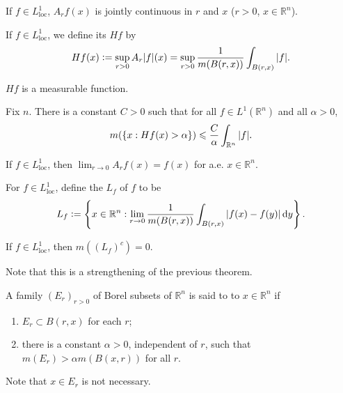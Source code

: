 \documentclass[12pt]{article}	%
\newcommand{\loc}{L^{1}_{\operatorname{loc}}}
\begin{document}
\begin{prop}
	If $f \in \loc$, $A_{r}f(x)$ is jointly continuous in $r$ and $x$ ($r > 0$, $x \in \mathbb{R}^{n}$).
\end{prop}

\begin{defn}
	If $f \in \loc$, we define its  $Hf$ by
	\begin{equation*} 
		Hf(x) \vcentcolon= \sup_{r > 0} A_{r}{\left\lvert f \right\lvert}(x) = \sup_{r > 0} \frac{1}{m(B(r, x))} \int_{B(r, x)} {\left\lvert f \right\lvert}.
	\end{equation*}
\end{defn}
$Hf$ is a measurable function.

\begin{thm}
	Fix $n$. There is a constant $C > 0$ such that for all $f \in L^{1}(\mathbb{R}^{n})$ and all $\alpha > 0$,
	\begin{equation*} 
		m(\{x : Hf(x) > \alpha\}) \leqslant \frac{C}{\alpha} \int_{\mathbb{R}^{n}} {\left\lvert f \right\lvert}.
	\end{equation*}
\end{thm}

\begin{thm}
	If $f \in \loc$, then $\lim_{r \to 0} A_{r}f(x) = f(x)$ for a.e. $x \in \mathbb{R}^{n}$.
\end{thm}

\begin{defn}
	For $f \in \loc$, define the  $L_{f}$ of $f$ to be 
	\begin{equation*} 
		L_{f} \vcentcolon= \left\{x \in \mathbb{R}^{n} : \lim_{r \to 0} \frac{1}{m(B(r, x))} \int_{B(r, x)} {\left\lvert f(x) - f(y) \right\lvert} \,{\mathrm{d}}y\right\}.
	\end{equation*}
\end{defn}

\begin{thm}
	If $f \in \loc$, then $m((L_{f})^{c}) = 0$.
\end{thm}
Note that this is a strengthening of the previous theorem.

\begin{defn}
	A family $(E_{r})_{r > 0}$ of Borel subsets of $\mathbb{R}^{n}$ is said to  to $x \in \mathbb{R}^{n}$ if
	\begin{enumerate}
		\item $E_{r} \subset B(r, x)$ for each $r$;
		\item there is a constant $\alpha > 0$, independent of $r$, such that $m(E_{r}) > \alpha m(B(x, r))$ for all $r$.
	\end{enumerate}
\end{defn}
Note that $x \in E_{r}$ is not necessary.
\end{document}
